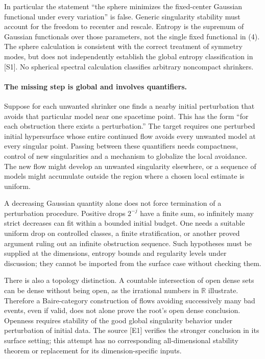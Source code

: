 \documentclass[11pt]{article}
\begin{document}
In particular the statement ``the sphere minimizes the fixed-center
Gaussian functional under every variation'' is false. Generic
singularity stability must account for the freedom to recenter and
rescale. Entropy is the supremum of Gaussian functionals over those
parameters, not the single fixed functional in (4). The sphere
calculation is consistent with the correct treatment of symmetry
modes, but does not independently establish the global entropy
classification in [S1]. No spherical spectral calculation classifies
arbitrary noncompact shrinkers.

\paragraph{The missing step is global and involves quantifiers.}
Suppose for each unwanted shrinker one finds a nearby initial
perturbation that avoids that particular model near one spacetime
point. This has the form ``for each obstruction there exists a
perturbation.'' The target requires one perturbed initial hypersurface
whose entire continued flow avoids every unwanted model at every
singular point. Passing between these quantifiers needs compactness,
control of new singularities and a mechanism to globalize the local
avoidance. The new flow might develop an unwanted singularity elsewhere,
or a sequence of models might accumulate outside the region where a
chosen local estimate is uniform.

A decreasing Gaussian quantity alone does not force termination of a
perturbation procedure. Positive drops $2^{-j}$ have a finite sum, so
infinitely many strict decreases can fit within a bounded initial
budget. One needs a suitable uniform drop on controlled classes, a
finite stratification, or another proved argument ruling out an
infinite obstruction sequence. Such hypotheses must be supplied at
the dimensions, entropy bounds and regularity levels under discussion;
they cannot be imported from the surface case without checking them.

There is also a topology distinction. A countable intersection of open
dense sets can be dense without being open, as the irrational numbers
in $\mathbb R$ illustrate. Therefore a Baire-category construction of
flows avoiding successively many bad events, even if valid, does not
alone prove the root's open dense conclusion. Openness requires
stability of the good global singularity behavior under perturbation
of initial data. The source [E1] verifies the stronger conclusion in
its surface setting; this attempt has no corresponding all-dimensional
stability theorem or replacement for its dimension-specific inputs.
\end{document}
